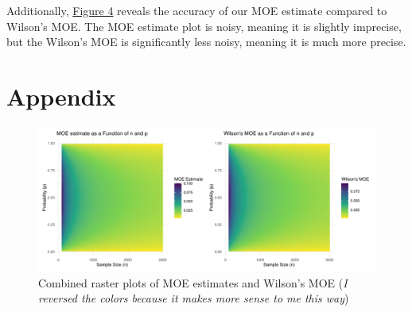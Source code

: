 \documentclass{article}\usepackage[]{graphicx}\usepackage[]{xcolor}
\begin{document}
\begin{multicols}{2}
Additionally, \hyperref[p4]{Figure 4} reveals the accuracy of our MOE estimate compared to Wilson's MOE. The MOE estimate plot is noisy, meaning it is slightly imprecise, but the Wilson's MOE is significantly less noisy, meaning it is much more precise.



\vspace{2em}


\begin{tiny}

\end{tiny}
\end{multicols}

\newpage
\onecolumn
\section{Appendix}

\begin{figure}[ht]
\label{p4}
\centering
\includegraphics[width=\linewidth]{w+e.pdf}
\caption{Combined raster plots of MOE estimates and Wilson's MOE (\emph{I reversed the colors because it makes more sense to me this way})}
\end{figure}
\end{document}
